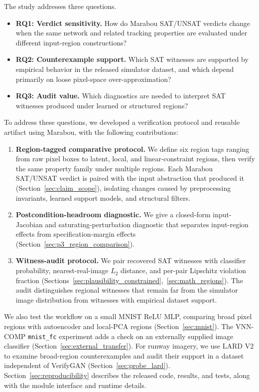 \documentclass[twocolumn,smallextended,runningheads]{svjour3}
\begin{document}
The study addresses three questions.
\begin{itemize}[nosep]
  \item \textbf{RQ1: Verdict sensitivity.} How do Marabou SAT/UNSAT verdicts change when the same network and related tracking properties are evaluated under different input-region constructions?
  \item \textbf{RQ2: Counterexample support.} Which SAT witnesses are supported by empirical behavior in the released simulator dataset, and which depend primarily on loose pixel-space over-approximation?
  \item \textbf{RQ3: Audit value.} Which diagnostics are needed to interpret SAT witnesses produced under learned or structured regions?
\end{itemize}

To address these questions, we developed a verification protocol and reusable artifact using Marabou, with the following contributions:
\begin{enumerate}[nosep]
  \item \textbf{Region-tagged comparative protocol.} We define six region tags ranging from raw pixel boxes to latent, local, and linear-constraint regions, then verify the same property family under multiple regions. Each Marabou SAT/UNSAT verdict is paired with the input abstraction that produced it (Section~\ref{sec:claim_scope}), isolating changes caused by preprocessing invariants, learned support models, and structural filters.
  \item \textbf{Postcondition-headroom diagnostic.} We give a closed-form input-Jacobian and saturating-perturbation diagnostic that separates input-region effects from specification-margin effects (Section~\ref{sec:p3_region_comparison}).
  \item \textbf{Witness-audit protocol.} We pair recovered SAT witnesses with classifier probability, nearest-real-image $L_2$ distance, and per-pair Lipschitz violation fraction (Sections~\ref{sec:plausibility_constrained},~\ref{sec:math_regions}). The audit distinguishes regional witnesses that remain far from the simulator image distribution from witnesses with empirical dataset support.
\end{enumerate}

We also test the workflow on a small MNIST ReLU MLP, comparing broad pixel regions with autoencoder and local-PCA regions (Section~\ref{sec:mnist}). The VNN-COMP \texttt{mnist\_fc} experiment adds a check on an externally supplied image classifier (Section~\ref{sec:external_transfer}). For runway imagery, we use LARD V2 to examine broad-region counterexamples and audit their support in a dataset independent of VerifyGAN (Section~\ref{sec:probe_lard}). Section~\ref{sec:reproducibility} describes the released code, results, and tests, along with the module interface and runtime details.
\end{document}
